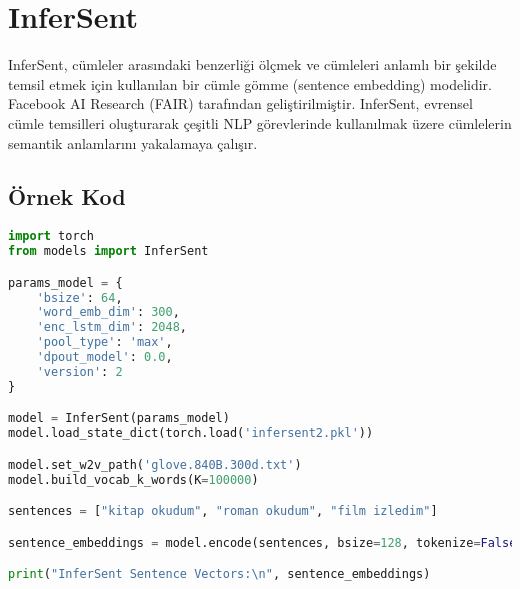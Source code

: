 \section{InferSent}

InferSent, cümleler arasındaki benzerliği ölçmek ve cümleleri anlamlı bir şekilde temsil etmek için kullanılan bir cümle gömme (sentence embedding) modelidir. Facebook AI Research (FAIR) tarafından geliştirilmiştir. InferSent, evrensel cümle temsilleri oluşturarak çeşitli NLP görevlerinde kullanılmak üzere cümlelerin semantik anlamlarını yakalamaya çalışır. 

\subsection{Örnek Kod}

\begin{lstlisting}[language=Python]
import torch
from models import InferSent

params_model = {
    'bsize': 64,
    'word_emb_dim': 300,
    'enc_lstm_dim': 2048,
    'pool_type': 'max',
    'dpout_model': 0.0,
    'version': 2
}

model = InferSent(params_model)
model.load_state_dict(torch.load('infersent2.pkl'))

model.set_w2v_path('glove.840B.300d.txt')
model.build_vocab_k_words(K=100000)

sentences = ["kitap okudum", "roman okudum", "film izledim"]

sentence_embeddings = model.encode(sentences, bsize=128, tokenize=False)

print("InferSent Sentence Vectors:\n", sentence_embeddings)
\end{lstlisting}

\newpage